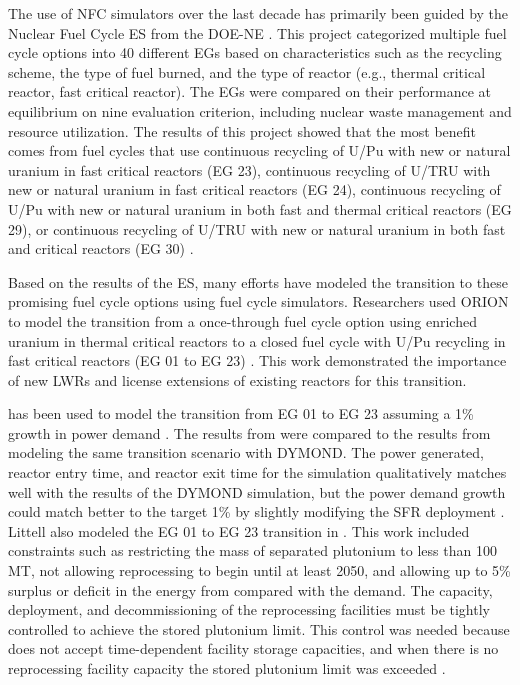The use of \gls{NFC} simulators over the 
last decade has primarily been guided by the Nuclear Fuel Cycle \gls{ES} 
from the \gls{DOE-NE} \cite{wigeland_nuclear_2014}. This project
categorized multiple fuel cycle options into 40 different \glspl{EG} 
based on characteristics such as the recycling scheme, the type of fuel 
burned, 
and the type of reactor (e.g., thermal critical reactor, fast critical reactor). 
The \glspl{EG} were compared on their performance at equilibrium on nine evaluation 
criterion, including nuclear waste management and resource utilization. The 
results of this project showed that the most benefit comes from fuel cycles 
that use continuous recycling of U/Pu with new or natural uranium in fast critical 
reactors (\gls{EG} 23), continuous recycling of U/\gls{TRU} with new or natural 
uranium in fast critical reactors (\gls{EG} 24), continuous recycling of U/Pu 
with new or natural uranium in both fast and thermal critical reactors 
(\gls{EG} 29), or continuous recycling of U/\gls{TRU} with new or natural uranium in 
both fast and critical reactors (\gls{EG} 30) \cite{wigeland_nuclear_2014}. 

Based on the results of the \gls{ES}, many efforts have modeled 
the transition to these promising fuel cycle options using fuel cycle 
simulators. Researchers used ORION to model the transition from a 
once-through fuel cycle option using enriched uranium in thermal critical 
reactors to a closed fuel cycle with U/Pu recycling in fast 
critical reactors (\gls{EG} 01 to \gls{EG} 23) \cite{sunny_transition_2015}.
This work 
demonstrated the importance of new \glspl{LWR} and license 
extensions of existing reactors for this transition. 

\Cyclus has been used to model the transition from \gls{EG} 01 to \gls{EG} 
23 assuming a 1\% growth in power demand 
\cite{djokic_application_2015}. The results from \Cyclus were compared 
to the results from modeling the same transition scenario with \gls{DYMOND}. 
The power generated, reactor entry 
time, and reactor exit time for the \Cyclus simulation qualitatively 
matches well with the results of the \gls{DYMOND} simulation, but the power 
demand growth could match better to the target 1\% by slightly modifying 
the \gls{SFR} deployment \cite{djokic_application_2015}. Littell 
\cite{littell_development_2016}
also modeled the \gls{EG} 01 to \gls{EG} 23 transition in \Cyclus. 
This work included constraints such as restricting the mass of separated 
plutonium to less than 100 MT, not allowing reprocessing to begin until 
at least 2050, and allowing up to 5\% surplus or deficit in the energy 
from compared with the demand. The capacity, deployment, and 
decommissioning of the reprocessing facilities must be tightly controlled
to achieve the stored plutonium limit. This control was needed 
because \Cyclus does not accept time-dependent facility storage capacities, 
and when there is no reprocessing facility capacity the stored plutonium 
limit was exceeded \cite{littell_development_2016}. 

